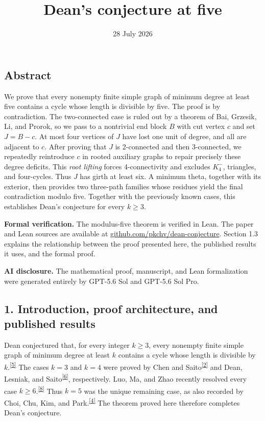 \documentclass[
  11pt]{article}
\title{Dean's conjecture at five}
\author{}
\date{28 July 2026}
\let\papersection\subsection
\renewcommand{\subsection}{\Needspace{10\baselineskip}\papersection}
\begin{document}
\maketitle

\subsection{Abstract}\label{abstract}

We prove that every nonempty finite simple graph of minimum degree at
least five contains a cycle whose length is divisible by five. The proof
is by contradiction. The two-connected case is ruled out by a theorem of
Bai, Grzesik, Li, and Prorok, so we pass to a nontrivial end block \(B\)
with cut vertex \(c\) and set \(J=B-c\). At most four vertices of \(J\)
have lost one unit of degree, and all are adjacent to \(c\). After
proving that \(J\) is 2-connected and then 3-connected, we repeatedly
reintroduce \(c\) in rooted auxiliary graphs to repair precisely these
degree deficits. This \emph{root lifting} forces 4-connectivity and
excludes \(K_4^-\), triangles, and four-cycles. Thus \(J\) has girth at
least six. A minimum theta, together with its exterior, then provides
two three-path families whose residues yield the final contradiction
modulo five. Together with the previously known cases, this establishes
Dean's conjecture for every \(k\ge3\).

\textbf{Formal verification.} The modulus-five theorem is verified in
Lean. The paper and Lean sources are available at
\href{https://github.com/pkchv/dean-conjecture}{github.com/pkchv/dean-conjecture}.
Section 1.3 explains the relationship between the proof presented here,
the published results it uses, and the formal proof.

\textbf{AI disclosure.} The mathematical proof, manuscript, and Lean
formalization were generated entirely by GPT-5.6 Sol and GPT-5.6 Sol
Pro.

\newpage

\subsection{1. Introduction, proof architecture, and published
results}\label{introduction-proof-architecture-and-published-results}

Dean conjectured that, for every integer \(k\ge3\), every nonempty
finite simple graph of minimum degree at least \(k\) contains a cycle
whose length is divisible by
\(k\).\textsuperscript{\hyperref[ref-dean-1991]{{[}5{]}}} The cases
\(k=3\) and \(k=4\) were proved by Chen and
Saito\textsuperscript{\hyperref[ref-chen-saito-1994]{{[}2{]}}} and Dean,
Lesniak, and
Saito\textsuperscript{\hyperref[ref-dean-lesniak-saito-1993]{{[}6{]}}},
respectively. Luo, Ma, and Zhao recently resolved every case
\(k\ge6\).\textsuperscript{\hyperref[ref-luo-ma-zhao-2026]{{[}8{]}}}
Thus \(k=5\) was the unique remaining case, as also recorded by Choi,
Chu, Kim, and
Park.\textsuperscript{\hyperref[ref-choi-chu-kim-park-2026]{{[}4{]}}}
The theorem proved here therefore completes Dean's conjecture.
\end{document}
